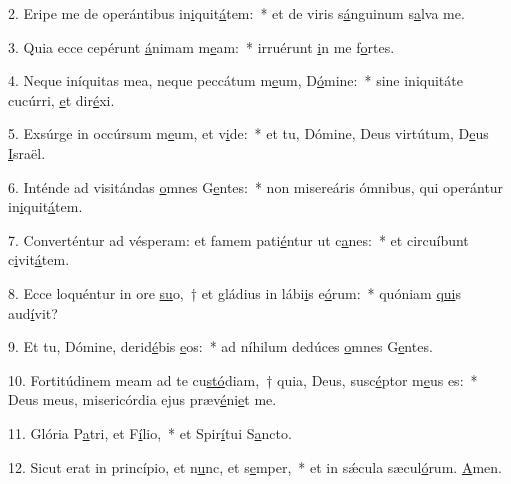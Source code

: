 2. Eripe me de operántibus in\uline{i}quit\uline{á}tem:~* et de viris s\uline{á}nguinum s\uline{a}lva me.\par 
3. Quia ecce cepérunt \uline{á}nimam m\uline{e}am:~* irruérunt \uline{i}n me f\uline{o}rtes.\par 
4. Neque iníquitas mea, neque peccátum m\uline{e}um, D\uline{ó}mine:~* sine iniquitáte cucúrri, \uline{e}t dir\uline{é}xi.\par 
5. Exsúrge in occúrsum m\uline{e}um, et v\uline{i}de:~* et tu, Dómine, Deus virtútum, D\uline{e}us \uline{I}sraël.\par 
6. Inténde ad visitándas \uline{o}mnes G\uline{e}ntes:~* non misereáris ómnibus, qui operántur in\uline{i}quit\uline{á}tem.\par 
7. Converténtur ad vésperam: et famem pati\uline{é}ntur ut c\uline{a}nes:~* et circuíbunt c\uline{i}vit\uline{á}tem.\par 
8. Ecce loquéntur in ore \uline{su}o,~† et gládius in lábi\uline{i}s e\uline{ó}rum:~* quóniam \uline{qui}s aud\uline{í}vit?\par 
9. Et tu, Dómine, derid\uline{é}bis \uline{e}os:~* ad níhilum dedúces \uline{o}mnes G\uline{e}ntes.\par 
10. Fortitúdinem meam ad te cu\uline{stó}diam,~† quia, Deus, susc\uline{é}ptor m\uline{e}us es:~* Deus meus, misericórdia ejus præv\uline{é}ni\uline{e}t me.\par 
11. Glória P\uline{a}tri, et F\uline{í}lio,~* et Spir\uline{í}tui S\uline{a}ncto.\par 
12. Sicut erat in princípio, et n\uline{u}nc, et s\uline{e}mper,~* et in sǽcula sæcul\uline{ó}rum. \uline{A}men.\par 
